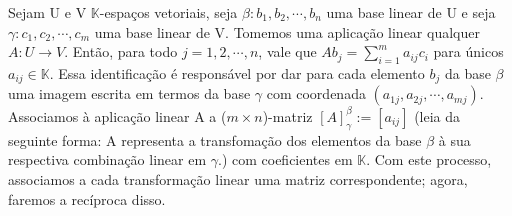 \documentclass{article}
\begin{document}
Sejam U e V $\mathbb{K}$-espa\c cos vetoriais, seja $\beta: b_1, b_2, \cdots, b_n$ uma base linear de U e seja
$\gamma: c_1, c_2, \cdots, c_m$ uma base linear de V. Tomemos uma aplica\c c\~ao linear qualquer $A: U \rightarrow{V}$.
Ent\~ao, para todo $j = 1, 2, \cdots, n$, vale que $Ab_j = \sum\limits_{i=1}^{m}a_{ij}c_i$ para \'unicos $a_{ij}\in\mathbb{K}$.
Essa identifica\c c\~ao \'e respons\'avel por dar para cada elemento $b_j$ da base $\beta$ uma imagem escrita em termos
da base $\gamma$ com coordenada $(a_{1j}, a_{2j}, \cdots, a_{mj})$. Associamos \`a aplica\c c\~ao linear A a
($m \times n$)-matriz $[A]_{\gamma}^{\beta}:=[a_{ij}]$ (leia da seguinte forma: A representa a transfoma\c c\~ao dos elementos
da base $\beta$ \`a sua respectiva combina\c c\~ao linear em $\gamma$.) com coeficientes em $\mathbb{K}$. Com este processo,
associamos a cada transforma\c c\~ao linear uma matriz correspondente; agora, faremos a rec\'iproca disso.
\end{document}
